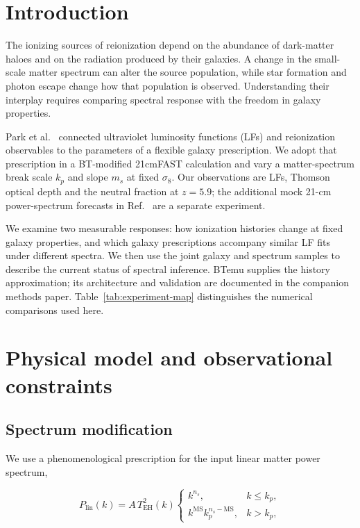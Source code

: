 \section{Introduction}\label{introduction}

The ionizing sources of reionization depend on the abundance of dark-matter haloes and on the radiation produced by their galaxies. A change in the small-scale matter spectrum can alter the source population, while star formation and photon escape change how that population is observed. Understanding their interplay requires comparing spectral response with the freedom in galaxy properties.

Park et al.~\cite{Park2019} connected ultraviolet luminosity functions (LFs) and reionization observables to the parameters of a flexible galaxy prescription. We adopt that prescription in a BT-modified 21cmFAST calculation \cite{Mesinger2011,Murray2020} and vary a matter-spectrum break scale $k_p$ and slope $m_s$ at fixed $\sigma_8$. Our observations are LFs, Thomson optical depth and the neutral fraction at $z=5.9$; the additional mock 21-cm power-spectrum forecasts in Ref.~\cite{Park2019} are a separate experiment.

We examine two measurable responses: how ionization histories change at fixed galaxy properties, and which galaxy prescriptions accompany similar LF fits under different spectra. We then use the joint galaxy and spectrum samples to describe the current status of spectral inference. BTemu supplies the history approximation; its architecture and validation are documented in the companion methods paper. Table~\ref{tab:experiment-map} distinguishes the numerical comparisons used here.

\section{Physical model and observational constraints}\label{physical-model-and-simulations}

\subsection{Spectrum modification}\label{spectrum-modification}

We use a phenomenological prescription for the input linear matter power spectrum,

\[
P_{\mathrm{lin}}(k)=A\,T_{\mathrm{EH}}^2(k)
\begin{cases}
k^{n_s}, & k\leq k_p,\\
k^{\mathrm{MS}}k_p^{n_s-\mathrm{MS}}, & k>k_p,
\end{cases}
\]

